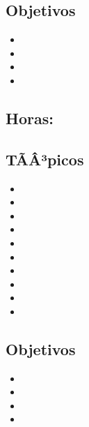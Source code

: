 \subsection*{Objetivos}
\begin{itemize}
	\item \DSDOSObjUNO
	\item \DSDOSObjDOS
	\item \DSDOSObjTRES
	\item \DSDOSObjCUATRO
\end{itemize}

\subsection{\DSTRESDef}\label{sec:BOK-DS3}
\subsection*{Horas: \DSTRESHours}

\subsection*{TÃÂ³picos}
\begin{itemize}
	\item \DSTRESTopicNociones
	\item \DSTRESTopicEstructura
	\item \DSTRESTopicPruebas
	\item \DSTRESTopicPruebasy
	\item \DSTRESTopicPruebaspor
	\item \DSTRESTopicPruebasporcontradiccion
	\item \DSTRESTopicInduccion
	\item \DSTRESTopicInduccionfuerte
	\item \DSTRESTopicDefiniciones
	\item \DSTRESTopicEl
\end{itemize}

\subsection*{Objetivos}
\begin{itemize}
	\item \DSTRESObjUNO
	\item \DSTRESObjDOS
	\item \DSTRESObjTRES
	\item \DSTRESObjCUATRO
\end{itemize}

